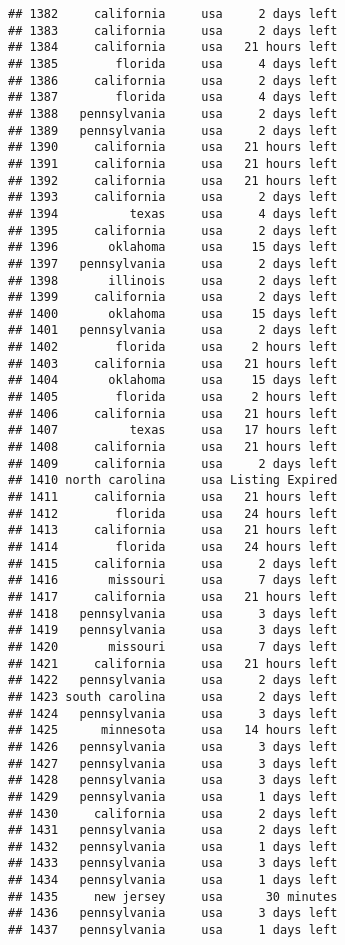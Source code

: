 \documentclass[
]{article}
\begin{document}
\begin{verbatim}
## 1382     california     usa     2 days left
## 1383     california     usa     2 days left
## 1384     california     usa   21 hours left
## 1385        florida     usa     4 days left
## 1386     california     usa     2 days left
## 1387        florida     usa     4 days left
## 1388   pennsylvania     usa     2 days left
## 1389   pennsylvania     usa     2 days left
## 1390     california     usa   21 hours left
## 1391     california     usa   21 hours left
## 1392     california     usa   21 hours left
## 1393     california     usa     2 days left
## 1394          texas     usa     4 days left
## 1395     california     usa     2 days left
## 1396       oklahoma     usa    15 days left
## 1397   pennsylvania     usa     2 days left
## 1398       illinois     usa     2 days left
## 1399     california     usa     2 days left
## 1400       oklahoma     usa    15 days left
## 1401   pennsylvania     usa     2 days left
## 1402        florida     usa    2 hours left
## 1403     california     usa   21 hours left
## 1404       oklahoma     usa    15 days left
## 1405        florida     usa    2 hours left
## 1406     california     usa   21 hours left
## 1407          texas     usa   17 hours left
## 1408     california     usa   21 hours left
## 1409     california     usa     2 days left
## 1410 north carolina     usa Listing Expired
## 1411     california     usa   21 hours left
## 1412        florida     usa   24 hours left
## 1413     california     usa   21 hours left
## 1414        florida     usa   24 hours left
## 1415     california     usa     2 days left
## 1416       missouri     usa     7 days left
## 1417     california     usa   21 hours left
## 1418   pennsylvania     usa     3 days left
## 1419   pennsylvania     usa     3 days left
## 1420       missouri     usa     7 days left
## 1421     california     usa   21 hours left
## 1422   pennsylvania     usa     2 days left
## 1423 south carolina     usa     2 days left
## 1424   pennsylvania     usa     3 days left
## 1425      minnesota     usa   14 hours left
## 1426   pennsylvania     usa     3 days left
## 1427   pennsylvania     usa     3 days left
## 1428   pennsylvania     usa     3 days left
## 1429   pennsylvania     usa     1 days left
## 1430     california     usa     2 days left
## 1431   pennsylvania     usa     2 days left
## 1432   pennsylvania     usa     1 days left
## 1433   pennsylvania     usa     3 days left
## 1434   pennsylvania     usa     1 days left
## 1435     new jersey     usa      30 minutes
## 1436   pennsylvania     usa     3 days left
## 1437   pennsylvania     usa     1 days left

\end{verbatim}
\end{document}
